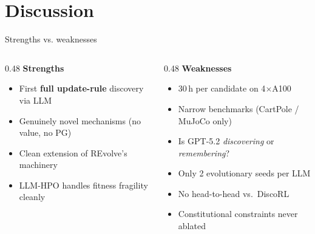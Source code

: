 \documentclass[10pt, aspectratio=169]{beamer}
\newcommand{\hilite}[1]{{\color{UofSCGarnet}\textbf{#1}}}
\begin{document}

\section*{Discussion}

\begin{frame}{Strengths vs. weaknesses}
  \begin{columns}[T]
    \begin{column}{0.48\textwidth}
      \textbf{\color{UofSCGarnet}Strengths}
      \vspace{0.3em}
      \begin{itemize}
        \item First \hilite{full update-rule} discovery via LLM
        \item Genuinely novel mechanisms (no value, no PG)
        \item Clean extension of REvolve's machinery
        \item LLM-HPO handles fitness fragility cleanly
      \end{itemize}
    \end{column}
    \begin{column}{0.48\textwidth}
      \textbf{\color{UofSCRose}Weaknesses}
      \vspace{0.3em}
      \begin{itemize}
        \item 30\,h per candidate on 4$\times$A100
        \item Narrow benchmarks (CartPole / MuJoCo only)
        \item Is GPT-5.2 \textit{discovering} or \textit{remembering}?
        \item Only 2 evolutionary seeds per LLM
        \item No head-to-head vs.\ DiscoRL
        \item Constitutional constraints never ablated
      \end{itemize}
    \end{column}
  \end{columns}
\end{frame}

\end{document}
